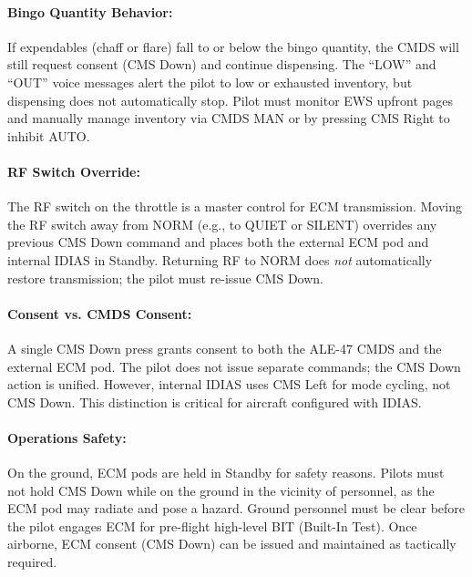 \documentclass[11pt, a4paper, twoside]{report}
\begin{document}
\paragraph{Bingo Quantity Behavior:}

If expendables (chaff or flare) fall to or below the bingo quantity, the CMDS will still request consent (CMS Down) and continue dispensing. The ``LOW'' and ``OUT'' voice messages alert the pilot to low or exhausted inventory, but dispensing does not automatically stop. Pilot must monitor EWS upfront pages and manually manage inventory via CMDS MAN or by pressing CMS Right to inhibit AUTO.

\paragraph{RF Switch Override:}

The RF switch on the throttle is a master control for ECM transmission. Moving the RF switch away from NORM (e.g., to QUIET or SILENT) overrides any previous CMS Down command and places both the external ECM pod and internal IDIAS in Standby. Returning RF to NORM does \textit{not} automatically restore transmission; the pilot must re-issue CMS Down.

\paragraph{Consent vs. CMDS Consent:}

A single CMS Down press grants consent to both the ALE-47 CMDS and the external ECM pod. The pilot does not issue separate commands; the CMS Down action is unified. However, internal IDIAS uses CMS Left for mode cycling, not CMS Down. This distinction is critical for aircraft configured with IDIAS.

\paragraph{Operations Safety:}

On the ground, ECM pods are held in Standby for safety reasons. Pilots must not hold CMS Down while on the ground in the vicinity of personnel, as the ECM pod may radiate and pose a hazard. Ground personnel must be clear before the pilot engages ECM for pre-flight high-level BIT (Built-In Test). Once airborne, ECM consent (CMS Down) can be issued and maintained as tactically required.

\end{document}

